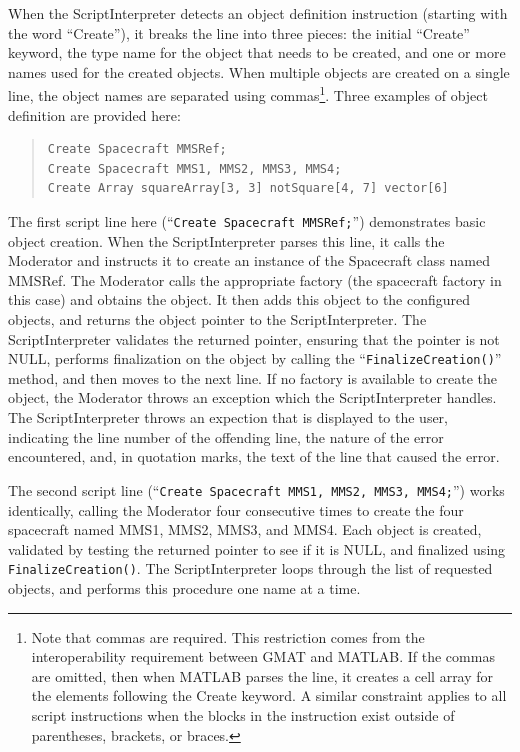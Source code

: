 When the ScriptInterpreter detects an object definition instruction (starting with the word
``Create''), it breaks the line into three pieces: the initial ``Create'' keyword, the type name for
the object that needs to be created, and one or more names used for the created objects.  When
multiple objects are created on a single line, the object names are separated using
commas\footnote{Note that commas are required. This restriction comes from the interoperability
requirement between GMAT and MATLAB.  If the commas are omitted, then when MATLAB parses the line,
it creates a cell array for the elements following the Create keyword.  A similar constraint applies
to all script instructions when the blocks in the instruction exist outside of parentheses,
brackets, or braces.}.  Three examples of object definition are provided here:

\begin{quote}
\linenumbers[1]
\begin{verbatim}
Create Spacecraft MMSRef;
Create Spacecraft MMS1, MMS2, MMS3, MMS4;
Create Array squareArray[3, 3] notSquare[4, 7] vector[6]
\end{verbatim}
\end{quote}

\noindent The first script line here (``\texttt{Create Spacecraft MMSRef;}'') demonstrates basic
object creation. When the ScriptInterpreter parses this line, it calls the Moderator and instructs
it to create an instance of the Spacecraft class named MMSRef.  The Moderator calls the appropriate
factory (the spacecraft factory in this case) and obtains the object.  It then adds this object to
the configured objects, and returns the object pointer to the ScriptInterpreter. The
ScriptInterpreter validates the returned pointer, ensuring that the pointer is not NULL, performs
finalization on the object by calling the ``\texttt{FinalizeCreation()}'' method, and then moves to
the next line.  If no factory is available to create the object, the Moderator throws an exception
which the ScriptInterpreter handles.  The ScriptInterpreter throws an expection that is displayed to
the user, indicating the line number of the offending line, the nature of the error encountered,
and, in quotation marks, the text of the line that caused the error.

The second script line (``\texttt{Create Spacecraft MMS1, MMS2, MMS3, MMS4;}'') works
identically, calling the Moderator four consecutive times to create the four spacecraft named MMS1,
MMS2, MMS3, and MMS4.  Each object is created, validated by testing the returned pointer to
see if it is NULL, and finalized using \texttt{FinalizeCreation()}.  The ScriptInterpreter loops
through the list of requested objects, and performs this procedure one name at a time.

